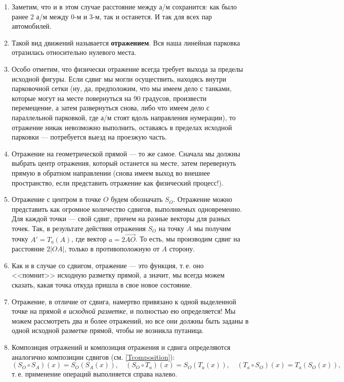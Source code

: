 \begin{enumerate}
\item Заметим, что и в этом случае расстояние между а/м сохранится: как было ранее 2 а/м между 0-м и 3-м, так и останется. И так для всех пар автомобилей.
\item Такой вид движений называется \textbf{отражением}. Вся наша линейная парковка отразилась относительно нулевого места.
\item Особо отметим, что физически отражение всегда требует выхода за пределы исходной фигуры. Если сдвиг мы могли осуществить, находясь внутри парковочной сетки (ну, да, предположим, что мы имеем дело с танками, которые могут на месте повернуться на 90 градусов, произвести перемещение, а затем развернуться снова, либо что имеем дело с параллельной парковкой, где а/м стоят вдоль направления нумерации), то отражение никак невозможно выполнить, оставаясь в пределах исходной парковки --- потребуется выезд на проезжую часть.
\item Отражение на геометрической прямой --- то же самое. Сначала мы должны выбрать центр отражения, который останется на месте, затем перевернуть прямую в обратном направлении (снова имеем выход во внешнее пространство, если представить отражение как физический процесс!).
\item Отражение с центром в точке $O$ будем обозначать $S_O$. Отражение можно представить как огромное количество сдвигов, выполняемых одновременно. Для каждой точки --- свой сдвиг, причем на разные векторы для разных точек. Так, в результате действия отражения $S_O$ на точку $A$ мы получим точку $A'=T_a(A)$, где вектор $a=2\vec{AO}$. То есть, мы производим сдвиг на расстояние $2|OA|$, только в противоположную от $A$ сторону.
\item Как и в случае со сдвигом, отражение --- это функция, т.\,е. оно <<помнит>> исходную разметку прямой, а значит, мы всегда можем сказать, какая точка откуда пришла в свое новое состояние.
\item Отражение, в отличие от сдвига, намертво привязано к одной выделенной точке на прямой \textit{в исходной разметке}, и полностью ею определяется! Мы можем рассмотреть два и более отражений, но все они должны быть заданы в одной исходной разметке прямой, чтобы не возникла путаница.
\item Композиция отражений и композиция отражения и сдвига определяются аналогично композиции сдвигов (см. \eqref{Tcomposition}):
$$
(S_O\circ S_A)(x) = S_O(S_A(x)),\quad (S_O\circ T_a)(x) = S_O(T_a(x)),\quad (T_a\circ S_O)(x) = T_a(S_O(x)),
$$
т.\,е. применение операций выполняется справа налево.

\end{enumerate}
